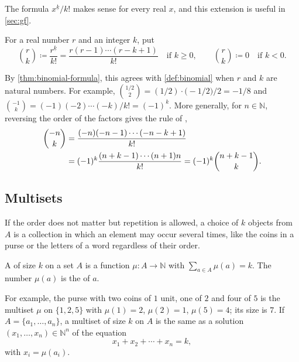 The formula $x^{\underline k}/k!$ makes sense for every real $x$, and this extension is useful in \cref{sec:gf}.

\begin{definition}
\label{def:binomial-general}
For a real number $r$ and an integer $k$, put
\[
\binom rk\coloneqq\frac{r^{\underline k}}{k!}=\frac{r(r-1)\cdots(r-k+1)}{k!}\quad\text{if }k\ge0,\qquad\binom rk\coloneqq0\quad\text{if }k<0 .
\]
\end{definition}

By \cref{thm:binomial-formula}, this agrees with \cref{def:binomial} when $r$ and $k$ are natural numbers. For example, $\binom{1/2}{2}=(1/2)\cdot\bigl(-1/2\bigr)/2=-1/8$ and $\binom{-1}{k}=(-1)(-2)\cdots(-k)/k!=(-1)^k$. More generally, for $n\in\mathbb N$, reversing the order of the factors gives the rule of ,
\begin{align}
\binom{-n}{k}&=\frac{(-n)(-n-1)\cdots(-n-k+1)}{k!}\notag\\
&=(-1)^k\frac{(n+k-1)\cdots(n+1)n}{k!}=(-1)^k\binom{n+k-1}{k} .
\label{eq:upper-negation}
\end{align}

\subsection{Multisets}

If the order does not matter but repetition is allowed, a choice of $k$ objects from $A$ is a collection in which an element may occur several times, like the coins in a purse or the letters of a word regardless of their order.

\begin{definition}[Multiset]
\label{def:multiset}
A  of size $k$ on a set $A$ is a function $\mu\colon A\to\mathbb N$ with $\sum_{a\in A}\mu(a)=k$. The number $\mu(a)$ is the  of $a$.
\end{definition}

For example, the purse with two coins of $1$ unit, one of $2$ and four of $5$ is the multiset $\mu$ on $\{1,2,5\}$ with $\mu(1)=2$, $\mu(2)=1$, $\mu(5)=4$; its size is $7$. If $A=\{a_1,\ldots,a_n\}$, a multiset of size $k$ on $A$ is the same as a solution $(x_1,\ldots,x_n)\in\mathbb N^n$ of the equation
\begin{equation}
x_1+x_2+\cdots+x_n=k ,
\label{eq:compositions}
\end{equation}
with $x_i=\mu(a_i)$.

